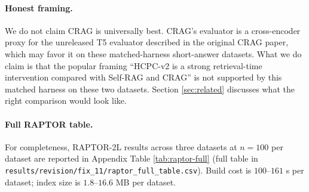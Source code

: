 \paragraph{Honest framing.}
We do not claim CRAG is universally best. CRAG's evaluator is a
cross-encoder proxy for the unreleased T5 evaluator described in
the original CRAG paper, which may favor it on these
matched-harness short-answer datasets. What we do claim is that
the popular framing ``HCPC-v2 is a strong retrieval-time
intervention compared with Self-RAG and CRAG'' is not supported
by this matched harness on these two datasets. Section
\ref{sec:related} discusses what the right comparison would look
like.

\paragraph{Full RAPTOR table.}
For completeness, RAPTOR-2L results across three datasets at
$n{=}100$ per dataset are reported in Appendix Table
\ref{tab:raptor-full} (full table in
\texttt{results/revision/fix\_11/raptor\_full\_table.csv}). Build
cost is \(100\)--\(161\) s per dataset; index size is
$1.8$--$16.6$ MB per dataset.
